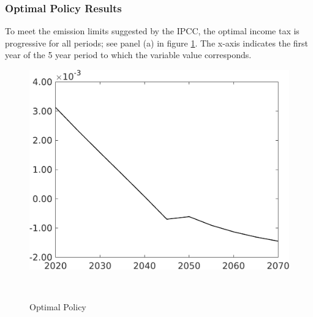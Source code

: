 \subsubsection{Optimal Policy Results}\label{sec:optres}
To meet the emission limits suggested by the IPCC, the optimal income tax is progressive for all periods; see panel (a) in figure \ref{fig:optPol}.  The x-axis indicates the first year of the 5 year period to which the variable value corresponds. 
\begin{figure}[h!!]
	\centering
	\caption{Optimal Policy }\label{fig:optPol}
	\begin{minipage}[]{0.32\textwidth}
		\includegraphics[width=1\textwidth]{../../codding_model/own_basedOnFried/optimalPol_010922_revision/figures/all_13Sept22_Tplus30/Single_OPT_T_NoTaus_taul_regime4_spillover0_knspil0_noskill0_sep0_xgrowth0_extern0_PV1_sizeequ0_GOV0_etaa0.79.png}
	\end{minipage}
\begin{minipage}[]{0.1\textwidth}
	\
\end{minipage}
	\begin{minipage}[]{0.32\textwidth}

\end{minipage}
\end{figure}
